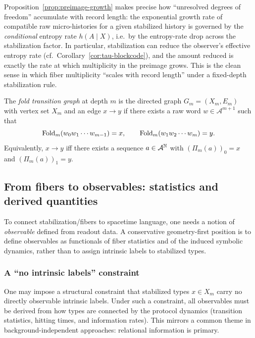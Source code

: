 \begin{remark}
Proposition~\ref{prop:preimage-growth} makes precise how ``unresolved degrees of freedom'' accumulate with record length: the exponential growth rate of compatible raw micro-histories for a given stabilized history is governed by the \emph{conditional} entropy rate $h(A\mid X)$, i.e.\ by the entropy-rate drop across the stabilization factor. In particular, stabilization can reduce the observer's effective entropy rate (cf.\ Corollary~\ref{cor:tau-blockcode}), and the amount reduced is exactly the rate at which multiplicity in the preimage grows. This is the clean sense in which fiber multiplicity ``scales with record length'' under a fixed-depth stabilization rule.\cite{CoverThomas2006}
\end{remark}

\begin{definition}\label{def:fold-graph}
The \emph{fold transition graph} at depth $m$ is the directed graph $G_m=(X_m,E_m)$ with vertex set $X_m$ and an edge $x\to y$ if there exists a raw word $w\in\mathcal{A}^{m+1}$ such that
\[
\mathrm{Fold}_m(w_0w_1\cdots w_{m-1})=x,\qquad \mathrm{Fold}_m(w_1w_2\cdots w_m)=y.
\]
Equivalently, $x\to y$ iff there exists a sequence $a\in\mathcal{A}^{\mathbb{N}}$ with $(\Pi_m(a))_0=x$ and $(\Pi_m(a))_1=y$.
\end{definition}

\subsection{From fibers to observables: statistics and derived quantities}\label{sec:stabilization:observables}

To connect stabilization/fibers to spacetime language, one needs a notion of \emph{observable} defined from readout data. A conservative geometry-first position is to define observables as functionals of fiber statistics and of the induced symbolic dynamics, rather than to assign intrinsic labels to stabilized types.

\subsubsection{A ``no intrinsic labels'' constraint}

One may impose a structural constraint that stabilized types $x\in X_m$ carry no directly observable intrinsic labels. Under such a constraint, all observables must be derived from how types are connected by the protocol dynamics (transition statistics, hitting times, and information rates). This mirrors a common theme in background-independent approaches: relational information is primary.

